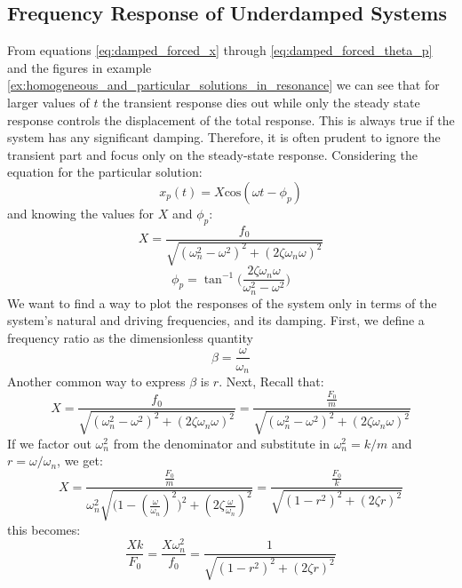 \documentclass[12pt,letter]{article}
\numberwithin{ex}{section} %
\numberwithin{re}{section} %
\begin{document}
		\subsection{Frequency Response of Underdamped Systems}						
			From equations \ref{eq:damped_forced_x} through \ref{eq:damped_forced_theta_p} and the figures in example \ref{ex:homogeneous_and_particular_solutions_in_resonance} we can see that for larger values of $t$ the transient response dies out while only the steady state response controls the displacement of the total response. This is always true if the system has any significant damping. Therefore, it is often prudent to ignore the transient part and focus only on the steady-state response. Considering the equation for the particular solution: 
			\begin{equation}
				x_p(t) = X \text{cos}(\omega t - \phi_p)
			\end{equation}			 
			and knowing the values for $X$ and $\phi_p$: 
			\begin{equation}
				X = \frac{f_0}{\sqrt{(\omega_n^2 - \omega^2)^2 +  (2\zeta \omega_n \omega)^2}} 
			\end{equation}	
			\begin{equation}
				\phi_p = \tan^{-1} \bigg(\frac{2\zeta \omega_n \omega}{\omega_n^2 - \omega^2}\bigg)
			\end{equation}	
			We want to find a way to plot the responses of the system only in terms of the system's natural and driving frequencies, and its damping. First, we define a frequency ratio as the dimensionless quantity 
			\begin{equation}
				\beta = \frac{\omega}{\omega_n}
			\end{equation}
			Another common way to express $\beta$ is $r$. Next, Recall that:
			\begin{equation}
				X = \frac{f_0}{\sqrt{(\omega_n^2 - \omega^2)^2 +  (2\zeta \omega_n \omega)^2}}  = \frac{\frac{F_0}{m}}{\sqrt{(\omega_n^2 - \omega^2)^2 +  (2\zeta \omega_n \omega)^2}} 
			\end{equation}				
			If we factor out $\omega_n^2$ from the denominator and substitute in $\omega_n^2 = k/m$ and $r = \omega/\omega_n$, we get:
			\begin{equation}
				X = \frac{\frac{F_0}{m}}{\omega_n^2 \sqrt{\big(1 - (\frac{\omega}{\omega_n})^2\big)^2 +  (2\zeta \frac{\omega}{\omega_n})^2}} =  \frac{\frac{F_0}{k}}{\sqrt{(1-r^2)^2+(2\zeta r)^2}}
			\end{equation}				
			this becomes:
			\begin{equation}
				\frac{Xk}{F_0} = \frac{X \omega_n^2}{f_0} = \frac{1}{\sqrt{(1-r^2)^2+(2\zeta r)^2}}
			\end{equation}				
\end{document}
